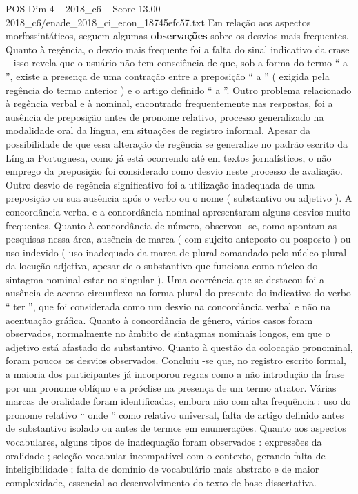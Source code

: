 \begin{textsample}{POS Dim 4 – 2018\_c6 – Score 13.00 – 2018\_c6/enade\_2018\_ci\_econ\_18745efc57.txt}
Em relação aos aspectos morfossintáticos, seguem algumas \textbf{observações} sobre os desvios mais frequentes.
Quanto à regência, o desvio mais frequente foi a falta do sinal indicativo da crase – isso revela que o usuário não tem consciência de que, sob a forma do termo “ a ”, existe a presença de uma contração entre a preposição “ a ” ( exigida pela regência do termo anterior ) e o artigo definido “ a ”.
Outro problema relacionado à regência verbal e à nominal, encontrado frequentemente nas respostas, foi a ausência de preposição antes de pronome relativo, processo generalizado na modalidade oral da língua, em situações de registro informal.
Apesar da possibilidade de que essa alteração de regência se generalize no padrão escrito da Língua Portuguesa, como já está ocorrendo até em textos jornalísticos, o não emprego da preposição foi considerado como desvio neste processo de avaliação.
Outro desvio de regência significativo foi a utilização inadequada de uma preposição ou sua ausência após o verbo ou o nome ( substantivo ou adjetivo ).
A concordância verbal e a concordância nominal apresentaram alguns desvios muito frequentes.
Quanto à concordância de número, observou -se, como apontam as pesquisas nessa área, ausência de marca ( com sujeito anteposto ou posposto ) ou uso indevido ( uso inadequado da marca de plural comandado pelo núcleo plural da locução adjetiva, apesar de o substantivo que funciona como núcleo do sintagma nominal estar no singular ).
Uma ocorrência que se destacou foi a ausência de acento circunflexo na forma plural do presente do indicativo do verbo “ ter ”, que foi considerada como um desvio na concordância verbal e não na acentuação gráfica.
Quanto à concordância de gênero, vários casos foram observados, normalmente no âmbito de sintagmas nominais longos, em que o adjetivo está afastado do substantivo.
Quanto à questão da colocação pronominal, foram poucos os desvios observados.
Concluiu -se que, no registro escrito formal, a maioria dos participantes já incorporou regras como a não introdução da frase por um pronome oblíquo e a próclise na presença de um termo atrator.
Várias marcas de oralidade foram identificadas, embora não com alta frequência : uso do pronome relativo “ onde ” como relativo universal, falta de artigo definido antes de substantivo isolado ou antes de termos em enumerações.
Quanto aos aspectos vocabulares, alguns tipos de inadequação foram observados : expressões da oralidade ; seleção vocabular incompatível com o contexto, gerando falta de inteligibilidade ; falta de domínio de vocabulário mais abstrato e de maior complexidade, essencial ao desenvolvimento do texto de base dissertativa.

\end{textsample}
